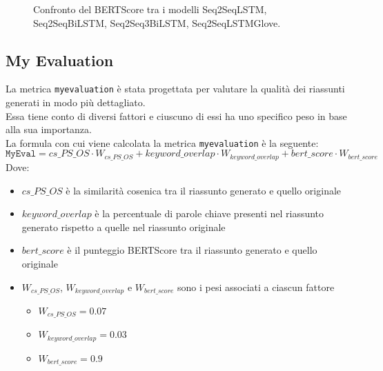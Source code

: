 \begin{figure}[H]
    \centering
    \hfill
    \hfill
    \hfill
    
    \caption{Confronto del BERTScore tra i modelli Seq2SeqLSTM, Seq2SeqBiLSTM, Seq2Seq3BiLSTM, Seq2SeqLSTMGlove.}
    \label{fig:bert_score_comparison}
\end{figure}

\subsection{My Evaluation}
La metrica \texttt{myevaluation} \`e stata progettata per valutare la qualit\`a dei riassunti generati in modo pi\`u dettagliato.\\
Essa tiene conto di diversi fattori e ciuscuno di essi ha uno specifico peso in base alla sua importanza.\\
La formula con cui viene calcolata la metrica \texttt{myevaluation} \`e la seguente:
\[
    \texttt{MyEval} = cs\_PS\_OS \cdot W_{cs\_PS\_OS} + keyword\_overlap \cdot W_{keyword\_overlap} + bert\_score \cdot W_{bert\_score}
\]
Dove:
\begin{itemize}
    \item $cs\_PS\_OS$ \`e la similarit\`a cosenica tra il riassunto generato e quello originale
    \item $keyword\_overlap$ \`e la percentuale di parole chiave presenti nel riassunto generato rispetto a quelle nel riassunto originale
    \item $bert\_score$ \`e il punteggio BERTScore tra il riassunto generato e quello originale
    \item $W_{cs\_PS\_OS}$, $W_{keyword\_overlap}$ e $W_{bert\_score}$ sono i pesi associati a ciascun fattore
    \begin{itemize}
        \item $W_{cs\_PS\_OS} = 0.07$
        \item $W_{keyword\_overlap} = 0.03$
        \item $W_{bert\_score} = 0.9$
    \end{itemize}
\end{itemize}

